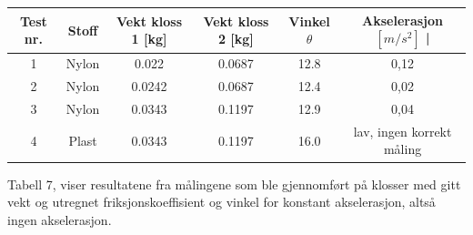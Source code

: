\documentclass[10pt,a4paper]{report}
\begin{document}
\begin{center}
  \begin{tabular}{| c | c | c | c | c  | c |}
    \hline
    Test nr. & Stoff & Vekt kloss 1 [kg] & Vekt kloss 2 [kg] & Vinkel $\theta$ & Akselerasjon $[m/s^2]$ | \\ \hline
    1 & Nylon & 0.022 & 0.0687 & 12.8 & 0,12 \\ \hline
    2 & Nylon & 0.0242 & 0.0687 & 12.4 & 0,02 \\ \hline
    3 & Nylon & 0.0343 & 0.1197 & 12.9 & 0,04 \\ \hline
    4 & Plast & 0.0343 & 0.1197 & 16.0 & lav, ingen korrekt måling  \\ \hline
  \end{tabular}
     \begin{tablenotes}
 	\small
 	\item Tabell 7, viser resultatene fra målingene som ble gjennomført på klosser med gitt vekt og utregnet friksjonskoeffisient og vinkel for konstant akselerasjon, altså ingen akselerasjon.
 	\end{tablenotes}
\end{center}
\end{document}

